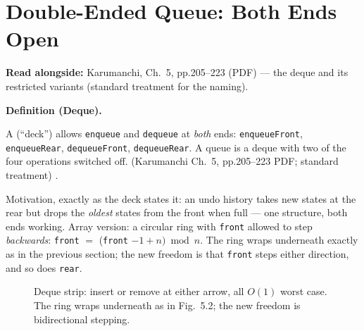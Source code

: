 \documentclass[11pt]{article}
\newenvironment{definitionbox}[1]{%
  \par\noindent\textbf{Definition (#1).}\ \itshape
}{\par\vspace{0.3em}}
\begin{document}
\section{Double-Ended Queue: Both Ends Open}

\textbf{Read alongside:} Karumanchi, Ch.~5, pp.205--223 (PDF) --- the deque and its restricted variants (standard treatment for the naming).

\begin{definitionbox}{Deque}
A  (``deck'') allows \texttt{enqueue} and \texttt{dequeue} at \emph{both} ends: \texttt{enqueueFront}, \texttt{enqueueRear}, \texttt{dequeueFront}, \texttt{dequeueRear}. A queue is a deque with two of the four operations switched off. (Karumanchi Ch.~5, pp.205--223 PDF; standard treatment) \cite{Karumanchi2017_data_structures_algorithms_made_easy}.
\end{definitionbox}

Motivation, exactly as the deck states it: an undo history takes new states at the rear but drops the \emph{oldest} states from the front when full --- one structure, both ends working. Array version: a circular ring with \texttt{front} allowed to step \emph{backwards}: \texttt{front} $=$ (\texttt{front} $- 1 + n) \bmod n$. The ring wraps underneath exactly as in the previous section; the new freedom is that \texttt{front} steps either direction, and so does \texttt{rear}.

\begin{figure}[h]
  \centering
  \caption{Deque strip: insert or remove at either arrow, all $O(1)$ worst case. The ring wraps underneath as in Fig.~5.2; the new freedom is bidirectional stepping.}
  \label{fig:deque}
\end{figure}
\end{document}
